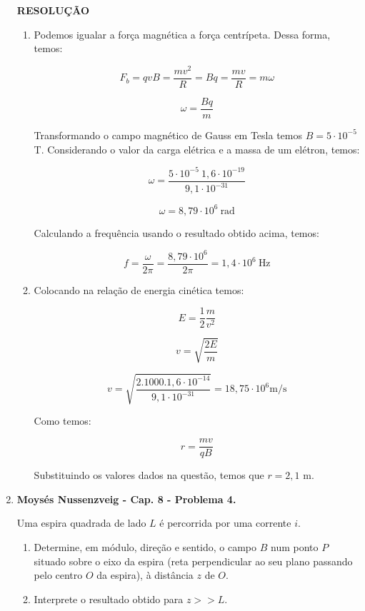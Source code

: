 \documentclass[11pt,a4paper]{article}
\begin{document}
\begin{enumerate}
\textbf{RESOLUÇÃO}

\begin{enumerate}

\item Podemos igualar a força magnética a força centrípeta. Dessa forma, temos:

$$F_b = qvB = \displaystyle\dfrac{mv^2}{R} = Bq = \displaystyle\dfrac{mv}{R} = m \omega$$

$$\omega = \displaystyle\dfrac{Bq}{m}$$

Transformando o campo magnético de Gauss em Tesla temos $B = 5 \cdot 10^{-5}$ T. Considerando o valor da carga elétrica e a massa de um elétron, temos:

$$\omega = \displaystyle\dfrac{5 \cdot 10^{-5} \ 1,6 \cdot 10^{-19}}{9,1 \cdot 10^{-31}}$$

$$\omega = 8,79 \cdot 10^{6} \ \textrm{rad}$$ 

Calculando a frequência usando o resultado obtido acima, temos:

$$f = \displaystyle\dfrac{\omega}{2\pi} = \displaystyle\dfrac{8,79 \cdot 10^6}{2\pi} = 1,4 \cdot 10^6 \ \textrm{Hz}$$

\item Colocando na relação de energia cinética temos:

$$E = \displaystyle\dfrac{1}{2}\displaystyle\dfrac{m}{v^2}$$

$$v = \sqrt{\displaystyle\dfrac{2E}{m}}$$

$$v = \sqrt{\displaystyle\dfrac{2.1000.1,6 \cdot 10^{-14}}{9,1 \cdot 10^{-31}}} = 18,75 \cdot 10^6 \textrm{m/s}$$

Como temos:

$$r = \displaystyle\dfrac{mv}{qB}$$

Substituindo os valores dados na questão, temos que $r = 2,1$ m.

\end{enumerate}

\item \textbf{Moysés Nussenzveig - Cap. 8 - Problema 4.}

Uma espira quadrada de lado $L$ é percorrida por uma corrente $i$. 

\begin{enumerate}
\item Determine, em módulo, direção e sentido, o campo $B$ num ponto $P$ situado sobre o eixo da espira (reta perpendicular ao seu plano passando pelo centro $O$ da espira), à distância $z$ de $O$. 
\item Interprete o resultado obtido para $z >> L$.
\end{enumerate}



\end{enumerate}
\end{document}
